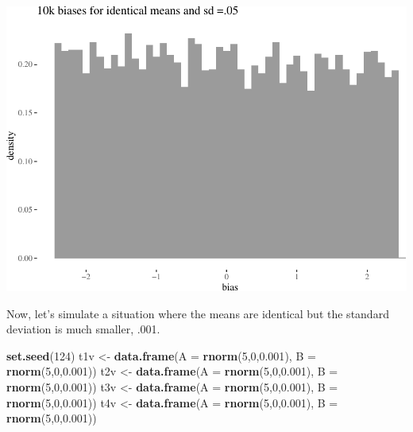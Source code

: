 \documentclass[10pt,dvipsnames,enabledeprecatedfontcommands]{scrartcl}
\newenvironment{Shaded}{\begin{snugshade}}{\end{snugshade}}
\newcommand{\KeywordTok}[1]{\textcolor[rgb]{0.13,0.29,0.53}{\textbf{#1}}}
\newcommand{\DataTypeTok}[1]{\textcolor[rgb]{0.13,0.29,0.53}{#1}}
\newcommand{\DecValTok}[1]{\textcolor[rgb]{0.00,0.00,0.81}{#1}}
\newcommand{\FloatTok}[1]{\textcolor[rgb]{0.00,0.00,0.81}{#1}}
\newcommand{\StringTok}[1]{\textcolor[rgb]{0.31,0.60,0.02}{#1}}
\newcommand{\NormalTok}[1]{#1}
\begin{document}
\begin{center}\includegraphics[width=1\linewidth]{paperDraft_files/figure-latex/unnamed-chunk-4-1} \end{center}

\normalsize

Now, let's simulate a situation where the means are identical but the
standard deviation is much smaller, .001.

\footnotesize

\begin{Shaded}
\begin{Highlighting}[]
\KeywordTok{set.seed}\NormalTok{(}\DecValTok{124}\NormalTok{)}
\NormalTok{t1v <-}\StringTok{ }\KeywordTok{data.frame}\NormalTok{(}\DataTypeTok{A  =} \KeywordTok{rnorm}\NormalTok{(}\DecValTok{5}\NormalTok{,}\DecValTok{0}\NormalTok{,}\FloatTok{0.001}\NormalTok{), }\DataTypeTok{B =} \KeywordTok{rnorm}\NormalTok{(}\DecValTok{5}\NormalTok{,}\DecValTok{0}\NormalTok{,}\FloatTok{0.001}\NormalTok{))}
\NormalTok{t2v <-}\StringTok{ }\KeywordTok{data.frame}\NormalTok{(}\DataTypeTok{A  =} \KeywordTok{rnorm}\NormalTok{(}\DecValTok{5}\NormalTok{,}\DecValTok{0}\NormalTok{,}\FloatTok{0.001}\NormalTok{), }\DataTypeTok{B =} \KeywordTok{rnorm}\NormalTok{(}\DecValTok{5}\NormalTok{,}\DecValTok{0}\NormalTok{,}\FloatTok{0.001}\NormalTok{))}
\NormalTok{t3v <-}\StringTok{ }\KeywordTok{data.frame}\NormalTok{(}\DataTypeTok{A  =} \KeywordTok{rnorm}\NormalTok{(}\DecValTok{5}\NormalTok{,}\DecValTok{0}\NormalTok{,}\FloatTok{0.001}\NormalTok{), }\DataTypeTok{B =} \KeywordTok{rnorm}\NormalTok{(}\DecValTok{5}\NormalTok{,}\DecValTok{0}\NormalTok{,}\FloatTok{0.001}\NormalTok{))}
\NormalTok{t4v <-}\StringTok{ }\KeywordTok{data.frame}\NormalTok{(}\DataTypeTok{A  =} \KeywordTok{rnorm}\NormalTok{(}\DecValTok{5}\NormalTok{,}\DecValTok{0}\NormalTok{,}\FloatTok{0.001}\NormalTok{), }\DataTypeTok{B =} \KeywordTok{rnorm}\NormalTok{(}\DecValTok{5}\NormalTok{,}\DecValTok{0}\NormalTok{,}\FloatTok{0.001}\NormalTok{))}
\end{Highlighting}
\end{Shaded}
\end{document}
